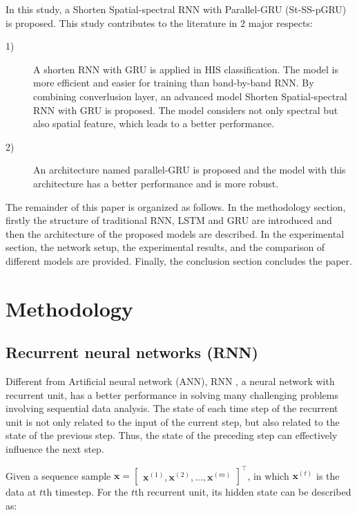 \documentclass[conference]{IEEEtran}
\begin{document}
In this study, a Shorten Spatial-spectral RNN with Parallel-GRU (St-SS-pGRU) is
proposed. This study contributes to the literature in 2 major respects:

\begin{description}
    \item[1)]
    A shorten RNN with GRU is applied in HIS classification. The model is more
    efficient and easier for training than band-by-band RNN. By combining converlusion
    layer, an advanced model Shorten Spatial-spectral RNN with GRU is proposed.
    The model considers not only spectral but also spatial feature, which leads to a
    better performance.
    \item[2)] 
    An architecture named parallel-GRU is proposed and the model with this architecture
    has a better performance and is more robust.
\end{description}

The remainder of this paper is organized as follows. In the methodology section,
firstly the structure of traditional RNN, LSTM and GRU are introduced and then the
architecture of the proposed models are described. In the experimental section, the
network setup, the experimental results, and the comparison of different models are
provided. Finally, the conclusion section concludes the paper.

\section{Methodology}

\subsection{Recurrent neural networks (RNN)}

Different from Artificial neural network (ANN), RNN \cite{williams1989learning},
a neural network with recurrent unit, has a better performance in solving many
challenging problems involving sequential data analysis. The state of each time
step of the recurrent unit is not only related to the input of the current step,
but also related to the state of the previous step. Thus, the state of the preceding
step can effectively influence the next step.

Given a sequence sample
{$\mathbf{x}={\begin{bmatrix}\mathbf{x}^{(1)},\mathbf{x}^{(2)},...,\mathbf{x}^{(m)}\end{bmatrix}}^{\top}$},
in which {$\mathbf{x}^{(t)}$} is the data at {$t$}th timestep. For the {$t$}th recurrent
unit, its hidden state can be described as:
\end{document}
